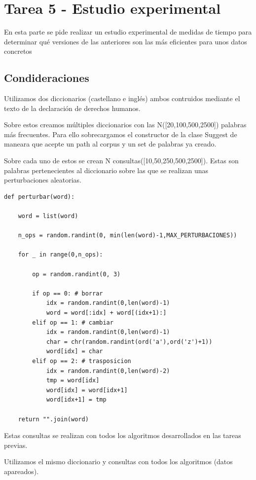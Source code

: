 \section{Tarea 5 - Estudio experimental}
En esta parte se pide realizar un estudio experimental de medidas de tiempo para determinar qué
versiones de las anteriores son las más eficientes para unos datos concretos
\subsection{Condideraciones}
Utilizamos dos diccionarios (castellano e inglés) ambos contruidos mediante el texto de la declaración de derechos humanos.

Sobre estos creamos múltiples diccionarios con las N([20,100,500,2500]) palabras más frecuentes. Para ello sobrecargamos el constructor de la clase Suggest de maneara que acepte un path al corpus y un set de palabras ya creado.

Sobre cada uno de estos se crean N consultas([10,50,250,500,2500]). Estas son palabras pertenecientes al diccionario sobre las que se realizan unas perturbaciones aleatorias.

\begin{lstlisting}[caption=Función para crear perturbaciones aleatorias]
def perturbar(word):

    word = list(word)

    n_ops = random.randint(0, min(len(word)-1,MAX_PERTURBACIONES))

    for _ in range(0,n_ops):

        op = random.randint(0, 3)

        if op == 0: # borrar
            idx = random.randint(0,len(word)-1)
            word = word[:idx] + word[(idx+1):]
        elif op == 1: # cambiar
            idx = random.randint(0,len(word)-1)
            char = chr(random.randint(ord('a'),ord('z')+1))
            word[idx] = char
        elif op == 2: # trasposicion
            idx = random.randint(0,len(word)-2)
            tmp = word[idx]
            word[idx] = word[idx+1]
            word[idx+1] = tmp

    return "".join(word)
\end{lstlisting}

Estas consultas se realizan con todos los algoritmos desarrollados en las tareas previas.

Utilizamos el mismo diccionario y consultas con todos los algoritmos (datos apareados).

